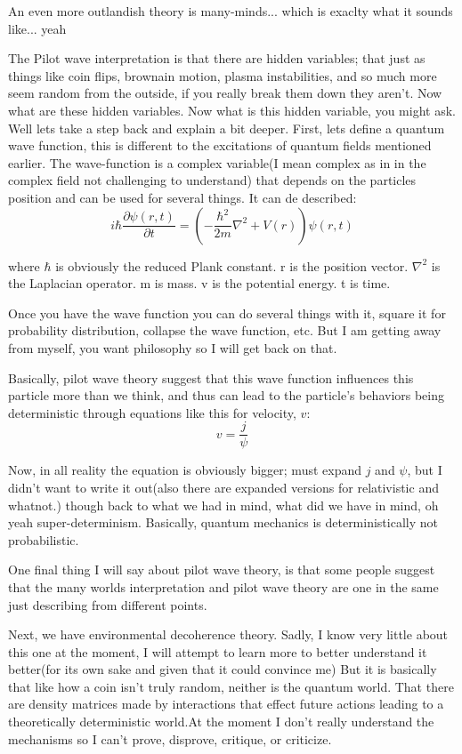 \par An even more outlandish theory is many-minds... which is exaclty what it sounds like... yeah
\par The Pilot wave interpretation is that there are hidden variables; that just as things like coin flips, brownain motion, plasma instabilities, and so much more seem random from the outside, if you really break them down they aren't. Now what are these hidden variables. Now what is this hidden variable, you might ask. Well lets take a step back and explain a bit deeper. First, lets define a quantum wave function, this is different to the excitations of quantum fields mentioned earlier. The wave-function is a complex variable(I mean complex as in in the complex field not challenging to understand) that depends on the particles position and can be used for several things. It can de described:
$$
i \hbar \frac{\partial \psi(r,t)}{\partial t}=(-\frac{\hbar ^2}{2m}\nabla ^2 +V(r))\psi (r,t)
$$
\par where $\hbar$ is obviously the reduced Plank constant. r is the position vector. $\nabla ^2$ is the Laplacian operator. m is mass. v is the potential energy. t is time.
\par Once you have the wave function you can do several things with it, square it for probability distribution, collapse the wave function, etc. But I am getting away from myself, you want philosophy so I will get back on that.
\par Basically, pilot wave theory suggest that this wave function influences this particle more than we think, and thus can lead to the particle's behaviors being deterministic through equations like this for velocity, $v$:
$$
v=\frac{j}{\psi}
$$
\par Now, in all reality the equation is obviously bigger; must expand $j$ and $\psi$, but I didn't want to write it out(also there are expanded versions for relativistic and whatnot.) though back to what we had in mind, what did we have in mind, oh yeah super-determinism. Basically, quantum mechanics is deterministically not probabilistic. 
\par One final thing I will say about pilot wave theory, is that some people suggest that the many worlds interpretation and pilot wave theory are one in the same just describing from different points.
\par Next, we have environmental decoherence theory. Sadly, I know very little about this one at the moment, I will attempt to learn more to better understand it better(for its own sake and given that it could convince me) But it is basically that like how a coin isn't truly random, neither is the quantum world. That there are density matrices made by interactions that effect future actions leading to a theoretically deterministic world.At the moment I don't really understand the mechanisms so I can't prove, disprove, critique, or criticize.
